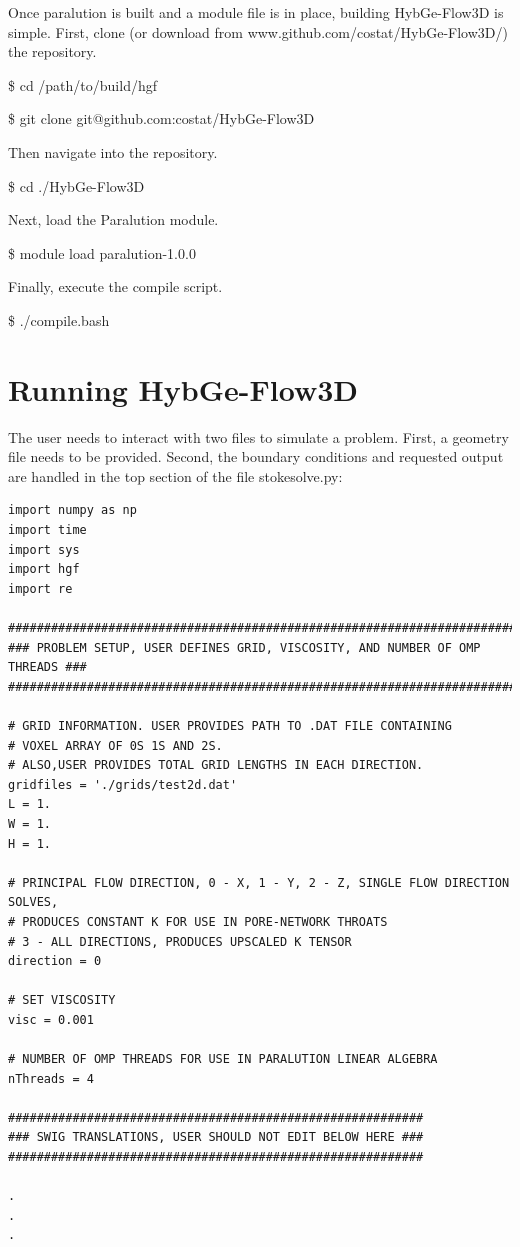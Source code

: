 \documentclass{report}
\begin{document}
Once paralution is built and a module file is in place, building
HybGe-Flow3D is simple.
First, clone (or download from www.github.com/costat/HybGe-Flow3D/) the repository.
\begin{mdframed}[style=MyFrame]
  \$ cd /path/to/build/hgf

  \noindent\$ git clone git@github.com:costat/HybGe-Flow3D
\end{mdframed}
Then navigate into the repository.
\begin{mdframed}[style=MyFrame]
  \$ cd ./HybGe-Flow3D
\end{mdframed}
Next, load the Paralution module.
\begin{mdframed}[style=MyFrame]
  \$ module load paralution-1.0.0
\end{mdframed}
Finally, execute the compile script.
\begin{mdframed}[style=MyFrame]
  \$ ./compile.bash
\end{mdframed}

\chapter{Running HybGe-Flow3D}

The user needs to interact with two files to simulate a problem.
First, a geometry file needs to be provided. Second,
the boundary conditions and requested output
are handled in the top section of the file stokesolve.py:

\lstset{style=custom}
\begin{lstlisting}
import numpy as np
import time
import sys
import hgf
import re

##############################################################################
### PROBLEM SETUP, USER DEFINES GRID, VISCOSITY, AND NUMBER OF OMP THREADS ###
##############################################################################

# GRID INFORMATION. USER PROVIDES PATH TO .DAT FILE CONTAINING
# VOXEL ARRAY OF 0S 1S AND 2S.
# ALSO,USER PROVIDES TOTAL GRID LENGTHS IN EACH DIRECTION.
gridfiles = './grids/test2d.dat'
L = 1.
W = 1.
H = 1.

# PRINCIPAL FLOW DIRECTION, 0 - X, 1 - Y, 2 - Z, SINGLE FLOW DIRECTION SOLVES,
# PRODUCES CONSTANT K FOR USE IN PORE-NETWORK THROATS
# 3 - ALL DIRECTIONS, PRODUCES UPSCALED K TENSOR
direction = 0

# SET VISCOSITY
visc = 0.001

# NUMBER OF OMP THREADS FOR USE IN PARALUTION LINEAR ALGEBRA
nThreads = 4

##########################################################
### SWIG TRANSLATIONS, USER SHOULD NOT EDIT BELOW HERE ###
##########################################################

.
.
.
\end{lstlisting}
\end{document}
